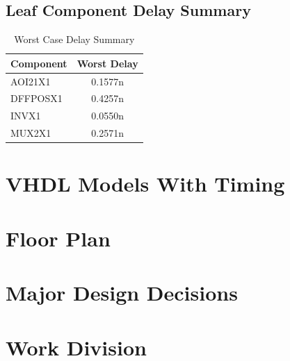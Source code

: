     \subsection{Leaf Component Delay Summary}

        \begin{table}[H]
            \centering
            \begin{tabular}{lc}
                \toprule
                \textbf{Component} & \textbf{Worst Delay} \\
                \midrule
                AOI21X1  & 0.1577n \\
                DFFPOSX1 & 0.4257n \\
                INVX1    & 0.0550n \\
                MUX2X1   & 0.2571n \\
                \bottomrule
            \end{tabular}
            \caption{Worst Case Delay Summary}
        \end{table}

\newpage
\section{VHDL Models With Timing}
    
    
    
    
\section{Floor Plan}
\section{Major Design Decisions}
\section{Work Division}

